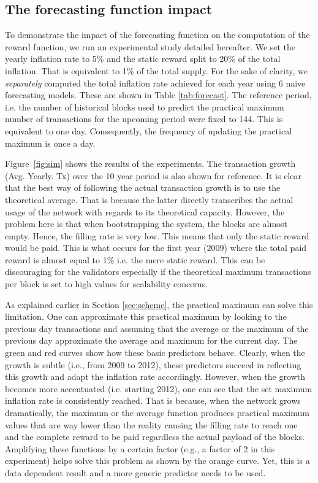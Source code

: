 \documentclass[conference]{IEEEtran}
\begin{document}
\subsection{The forecasting function impact}
To demonstrate the impact of the forecasting function on the computation of the reward function, we run an experimental study detailed hereafter. We set the yearly inflation rate to 5\% and the static reward split to 20\% of the total inflation. That is equivalent to 1\% of the total supply. For the sake of clarity, we \emph{separately} computed the total inflation rate achieved for each year using 6 naive forecasting models. These are shown in Table \ref{tab:forecast}. The reference period, i.e. the number of historical blocks used to predict the practical maximum number of transactions for the upcoming period were fixed to 144. This is equivalent to one day. Consequently, the frequency of updating the practical maximum is once a day.

Figure~\ref{fig:sim} shows the results of the experiments. The transaction growth (Avg. Yearly. Tx) over the 10 year period is also shown for reference. It is clear that the best way of following the actual transaction growth is to use the theoretical average. That is because the latter directly transcribes the actual usage of the network with regards to its theoretical capacity. However, the problem here is that when bootstrapping the system, the blocks are almost empty. Hence, the filling rate is very low. This means that only the static reward would be paid. This is what occurs for the first year (2009) where the total paid reward is almost equal to 1\% i.e. the mere static reward. This can be discouraging for the validators especially if the theoretical maximum transactions per block is set to high values for scalability concerns.

As explained earlier in Section \ref{sec:scheme}, the practical maximum can solve this limitation. One can approximate this practical maximum by looking to the previous day transactions and assuming that the average or the maximum of the previous day approximate the average and maximum for the current day. The green and red curves show how these basic predictors behave. Clearly, when the growth is subtle (i.e., from 2009 to 2012), these predictors succeed in reflecting this growth and adapt the inflation rate accordingly. However, when the growth becomes more accentuated (i.e. starting 2012), one can see that the set maximum inflation rate is consistently reached. That is because, when the network grows dramatically, the maximum or the average function produces practical maximum values that are way lower than the reality causing the filling rate to reach one and the complete reward to be paid regardless the actual payload of the blocks. Amplifying these functions by a certain factor (e.g., a factor of 2 in this experiment) helps solve this problem as shown by the orange curve. Yet, this is a data dependent result and a more generic predictor needs to be used.
\end{document}
